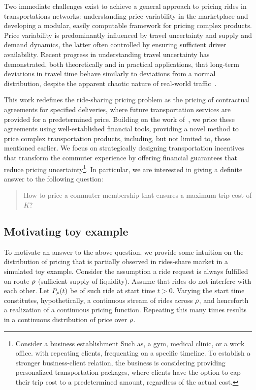 \documentclass[12pt]{article}
\begin{document}
Two immediate challenges exist to achieve a general approach to pricing rides in transportations networks: 
understanding price variability in the marketplace and developing a modular, easily computable framework for pricing complex products. Price variability is predominantly influenced by travel uncertainty and supply and demand dynamics, the latter often controlled by ensuring sufficient driver availability. Recent progress in understanding travel uncertainty has demonstrated, both theoretically and in practical applications, that long-term deviations in travel time behave similarly to deviations from a normal distribution, despite the apparent chaotic nature of real-world traffic~\cite{elmasri2020predictive, woodard2017predicting}.

This work redefines the ride-sharing pricing problem as the pricing of contractual agreements for specified deliveries, where future transportation services are provided for a predetermined price. Building on the work of~\cite{elmasri2020predictive}, we price these agreements using well-established financial tools, providing a novel method to price complex transportation products, including, but not limited to, those mentioned earlier. We focus on strategically designing transportation incentives that transform the commuter experience by offering financial guarantees that reduce pricing uncertainty\footnote{Consider a business establishment Such as, a gym, medical clinic, or a work office. with repeating clients, frequenting on a specific timeline. To establish a stronger business-client relation, the business is considering providing personalized transportation packages, where clients have the option to cap their trip cost to a predetermined amount, regardless of the actual cost.}. In particular, we are interested in giving a definite answer to the following question:
\begin{quote}
    How to price a commuter membership that ensures a maximum trip cost of $K$?
\end{quote}


\subsection{Motivating toy example}
To motivate an answer to the above question, we provide some intuition on the distribution of pricing that is partially observed in rides-share market in a simulated toy example. Consider the assumption a ride request is always fulfilled on route $\rho$ (sufficient supply of liquidity). Assume that rides do not interfere with each other. Let $P_\rho(t)$ be of such ride at start time $t>0$. Varying the start time constitutes, hypothetically, a continuous stream of rides across $\rho$, and henceforth a realization of a continuous pricing function. Repeating this many times results in a continuous distribution of price over $\rho$. 
\end{document}
